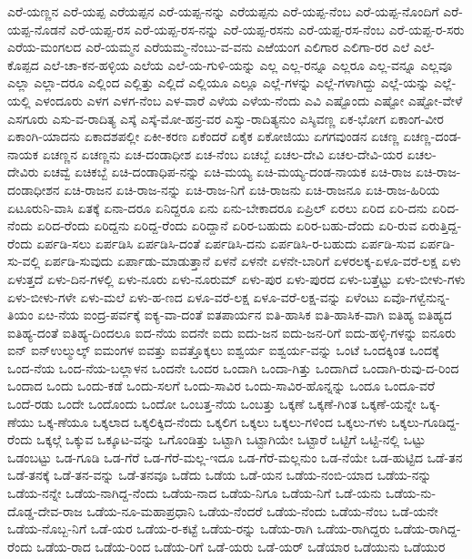 {ಎರೆ-ಯಣ್ಣನ
ಎರೆ-ಯಪ್ಪ
ಎರೆಯಪ್ಪನ
ಎರೆ-ಯಪ್ಪ-ನನ್ನು
ಎರೆಯಪ್ಪನು
ಎರೆ-ಯಪ್ಪ-ನೆಂಬ
ಎರೆ-ಯಪ್ಪ-ನೊಂದಿಗೆ
ಎರೆ-ಯಪ್ಪ-ನೊಡನೆ
ಎರೆ-ಯಪ್ಪ-ರಸ
ಎರೆ-ಯಪ್ಪ-ರಸ-ನನ್ನು
ಎರೆ-ಯಪ್ಪ-ರಸನು
ಎರೆ-ಯಪ್ಪ-ರಸ-ನೆಂಬ
ಎರೆ-ಯಪ್ಪ-ರ-ಸರು
ಎರೆಯ-ಮಂಗಲದ
ಎರೆ-ಯಮ್ಮನ
ಎರೆಯಮ್ಮ-ನೆಂಬು-ವ-ವನು
ಎಱೆಯಂಗ
ಎಲಿಗಾರ
ಎಲಿಗಾ-ರರ
ಎಲೆ
ಎಲೆ-ಕೊಪ್ಪದ
ಎಲೆ-ಚಾ-ಕನ-ಹಳ್ಳಿಯ
ಎಲೆಯ
ಎಲೆ-ಯ-ಗುಳಿ-ಯನ್ನು
ಎಲ್ಲ
ಎಲ್ಲ-ರನ್ನೂ
ಎಲ್ಲರೂ
ಎಲ್ಲ-ವನ್ನೂ
ಎಲ್ಲವೂ
ಎಲ್ಲಾ
ಎಲ್ಲಾ-ದರೂ
ಎಲ್ಲಿಂದ
ಎಲ್ಲಿತ್ತು
ಎಲ್ಲಿದೆ
ಎಲ್ಲಿಯೂ
ಎಲ್ಲೂ
ಎಲ್ಲೆ-ಗಳನ್ನು
ಎಲ್ಲೆ-ಗಳಾಗಿದ್ದು
ಎಲ್ಲೆ-ಯನ್ನು
ಎಲ್ಲೆ-ಯಲ್ಲಿ
ಎಳಂದೂರು
ಎಳಗ
ಎಳಗ-ನೆಂಬ
ಎಳ-ವಾರೆ
ಎಳೆಯ
ಎಳೆಯ-ನೆಂದು
ಎವಿ
ಎಷ್ಟೊಂದು
ಎಷ್ಟೋ
ಎಷ್ಟೋ-ವೇಳೆ
ಎಸಗೂರು
ಎಸು-ವ-ರಾದಿತ್ಯ
ಎಸ್ಕೆ
ಎಸ್ಕೆ-ಮೋ-ಹನ್ರ-ವರ
ಎಸ್ವು-ರಾದಿತ್ಯನುಂ
ಎಸ್ಶಿವಣ್ಣ
ಏಕ-ಭೋಗ
ಏಕಾಂಗ-ವೀರ
ಏಕಾಂಗಿ-ಯಾದನು
ಏಕಾದಶಪಲ್ಲೀ
ಏಕೀ-ಕರಣ
ಏಕೆಂದರೆ
ಏಕೈಕ
ಏಕೋಜಿಯು
ಏಗಗವುಂಡನ
ಏಚಣ್ಣ
ಏಚಣ್ಣ-ದಂಡ-ನಾಯಕ
ಏಚಣ್ಣನ
ಏಚಣ್ಣನು
ಏಚ-ದಂಡಾಧೀಶ
ಏಚ-ನೆಂಬ
ಏಚಬ್ಬೆ
ಏಚಲ-ದೇವಿ
ಏಚಲ-ದೇವಿ-ಯರ
ಏಚಲ-ದೇವಿರು
ಏಚವ್ವೆ
ಏಚಿಕಬ್ಬೆ
ಏಚಿ-ದಂಡಾಧಿಪ-ನನ್ನು
ಏಚಿ-ಮಯ್ಯ
ಏಚಿ-ಮಯ್ಯ-ದಂಡ-ನಾಯಕ
ಏಚಿ-ರಾಜ
ಏಚಿ-ರಾಜ-ದಂಡಾಧೀಶನ
ಏಚಿ-ರಾಜನ
ಏಚಿ-ರಾಜ-ನನ್ನು
ಏಚಿ-ರಾಜ-ನಿಗೆ
ಏಚಿ-ರಾಜನು
ಏಚಿ-ರಾಜನೂ
ಏಚಿ-ರಾಜ-ಹಿರಿಯ
ಏಟೂರುನಿ-ವಾಸಿ
ಏತಕ್ಕೆ
ಏನಾ-ದರೂ
ಏನಿದ್ದರೂ
ಏನು
ಏನು-ಬೇಕಾದರೂ
ಏಪ್ರಿಲ್
ಏರಲು
ಏರಿದ
ಏರಿ-ದನು
ಏರಿದ-ನೆಂದು
ಏರಿದ-ರೆಂದು
ಏರಿದ್ದನು
ಏರಿದ್ದ-ರೆಂದು
ಏರಿದ್ದಾನೆ
ಏರಿರ-ಬಹುದು
ಏರಿರ-ಬಹು-ದೆಂದು
ಏರಿ-ರುವ
ಏರುತ್ತಿದ್ದ-ರೆಂದು
ಏರ್ಪಡಿ-ಸಲು
ಏರ್ಪಡಿಸಿ
ಏರ್ಪಡಿಸಿ-ದಂತೆ
ಏರ್ಪಡಿಸಿ-ದನು
ಏರ್ಪಡಿಸಿ-ರ-ಬಹುದು
ಏರ್ಪಡಿ-ಸುವ
ಏರ್ಪಡಿ-ಸು-ವಲ್ಲಿ
ಏರ್ಪಡಿ-ಸುವುದು
ಏರ್ಪಾಡು-ಮಾಡುತ್ತಾನೆ
ಏಳನೆ
ಏಳನೇ
ಏಳನೇ-ಬಾರಿಗೆ
ಏಳರಲಕ್ಕ-ಏಳೂ-ವರೆ-ಲಕ್ಷ
ಏಳು
ಏಳುತ್ತದೆ
ಏಳು-ದಿನ-ಗಳಲ್ಲಿ
ಏಳು-ನೂರು
ಏಳು-ನೂರುಮ್
ಏಳು-ಪುರ
ಏಳು-ಪುರದ
ಏಳು-ಬತ್ತೆಟ್ಟು
ಏಳು-ಬೀಳು-ಗಳು
ಏಳು-ಬೀಳು-ಗಳೇ
ಏಳು-ಮಲೆ
ಏಳು-ಹ-ಣದ
ಏಳೂ-ವರೆ-ಲಕ್ಷ
ಏಳೂ-ವರೆ-ಲಕ್ಷ-ವನ್ನು
ಏಳೆಂಟು
ಏವೊ-ಗಳ್ವೆನುನ್ನ-ತಿಯಂ
ಏೞ-ನೆಯ
ಐಂದ್ರ-ಪರ್ವಕ್ಕೆ
ಐಕ್ಯ-ವಾ-ದಂತೆ
ಐತಪಾರ್ಯನ
ಐತಿ-ಹಾಸಿಕ
ಐತಿ-ಹಾಸಿಕ-ವಾಗಿ
ಐತಿಹ್ಯ
ಐತಿಹ್ಯದ
ಐತಿಹ್ಯ-ದಂತೆ
ಐತಿಹ್ಯ-ದಿಂದಲೂ
ಐದ-ನೆಯ
ಐದನೇ
ಐದು
ಐದು-ಜನ
ಐದು-ಜನ-ರಿಗೆ
ಐದು-ಹಳ್ಳಿ-ಗಳನ್ನು
ಐನೂರು
ಐನ್
ಐನ್ಉಲ್ಮುಲ್ಕ್
ಐಮಂಗಳ
ಐವತ್ತು
ಐವತ್ತೊಕ್ಕಲು
ಐಶ್ವರ್ಯ
ಐಶ್ವರ್ಯ-ವನ್ನು
ಒಂಟೆ
ಒಂದಕ್ಕಿಂತ
ಒಂದಕ್ಕೆ
ಒಂದ-ನೆಯ
ಒಂದ-ನೆಯ-ಬಲ್ಲಾಳನ
ಒಂದನೇ
ಒಂದರ
ಒಂದಾಗಿ
ಒಂದಾ-ಗಿತ್ತು
ಒಂದಾಗಿದೆ
ಒಂದಾಗಿ-ರುವು-ದ-ರಿಂದ
ಒಂದಾದ
ಒಂದು
ಒಂದು-ಕಡೆ
ಒಂದು-ಸಲಗೆ
ಒಂದು-ಸಾವಿರ
ಒಂದು-ಸಾವಿರ-ಹೊನ್ನನ್ನು
ಒಂದೂ
ಒಂದೂ-ವರೆ
ಒಂದೆ-ರಡು
ಒಂದೇ
ಒಂದೊಂದು
ಒಂದೋ
ಒಂಬತ್ತ-ನೆಯ
ಒಂಬತ್ತು
ಒಕ್ಕಣೆ
ಒಕ್ಕಣೆ-ಗಿಂತ
ಒಕ್ಕಣೆ-ಯನ್ನೇ
ಒಕ್ಕ-ಣೆಯು
ಒಕ್ಕ-ಣೆಯೂ
ಒಕ್ಕಲಾದ
ಒಕ್ಕಲಿಕ್ಕಿದ-ನೆಂದು
ಒಕ್ಕಲಿಗ
ಒಕ್ಕಲು
ಒಕ್ಕಲು-ಗಳಿಂದ
ಒಕ್ಕಲು-ಗಳು
ಒಕ್ಕಲು-ಗೂಡಿದ್ದ-ರೆಂದು
ಒಕ್ಕಲ್ಗೆ
ಒಕ್ಕುವ
ಒಕ್ಕೂಟ-ವನ್ನು
ಒಗೊಂಡಿತ್ತು
ಒಟ್ಟಾಗಿ
ಒಟ್ಟಾಗಿಯೇ
ಒಟ್ಟಾರೆ
ಒಟ್ಟಿಗೆ
ಒಟ್ಟಿ-ನಲ್ಲಿ
ಒಟ್ಟು
ಒಡಂಬಟ್ಟು
ಒಡ-ಗೂಡಿ
ಒಡ-ಗೆರೆ
ಒಡ-ಗೆರೆ-ಮಲ್ಲ-ಇದೂ
ಒಡ-ಗೆರೆ-ಮಲ್ಲನುಂ
ಒಡ-ನೆಯೇ
ಒಡ-ಹುಟ್ಟಿದ
ಒಡೆ-ತನ
ಒಡೆ-ತನಕ್ಕೆ
ಒಡೆ-ತನ-ವನ್ನು
ಒಡೆ-ತನವೂ
ಒಡೆದು
ಒಡೆಯ
ಒಡೆ-ಯನ
ಒಡೆಯ-ನಂಬಿ-ಯಾದ
ಒಡೆಯ-ನನ್ನು
ಒಡೆಯ-ನನ್ನೇ
ಒಡೆಯ-ನಾಗಿದ್ದ-ನೆಂದು
ಒಡೆಯ-ನಾದ
ಒಡೆಯ-ನಿಗೂ
ಒಡೆಯ-ನಿಗೆ
ಒಡೆ-ಯನು
ಒಡೆಯ-ನು-ದೊಡ್ಡ-ದೇವ-ರಾಜ
ಒಡೆಯ-ನೂ-ಮಹಾಪ್ರಧಾನಿ
ಒಡೆಯ-ನೆಂದರೆ
ಒಡೆಯ-ನೆಂದು
ಒಡೆಯ-ನೆಂಬ
ಒಡೆ-ಯನೇ
ಒಡೆಯ-ನೊಬ್ಬ-ನಿಗೆ
ಒಡೆ-ಯರ
ಒಡೆಯ-ರ-ಕಟ್ಟೆ
ಒಡೆಯ-ರನ್ನು
ಒಡೆಯ-ರಾಗಿ
ಒಡೆಯ-ರಾಗಿದ್ದರು
ಒಡೆಯ-ರಾಗಿದ್ದ-ರೆಂದು
ಒಡೆಯ-ರಾದ
ಒಡೆಯ-ರಿಂದ
ಒಡೆಯ-ರಿಗೆ
ಒಡೆ-ಯರು
ಒಡೆ-ಯರ್
ಒಡೆಯಾರ
ಒಡೆಯುನು
ಒಡೆಯುರ
}
